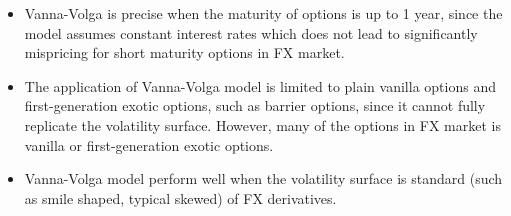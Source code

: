 \begin{itemize}
	\item Vanna-Volga is precise when the maturity of options is up to 1 year, since the model assumes constant interest rates which does not lead to significantly mispricing for short maturity options in FX market.
	\item The application of Vanna-Volga model is limited to plain vanilla options and first-generation exotic options, such as barrier options, since it cannot fully replicate the volatility surface. However, many of the options in FX market is vanilla or first-generation exotic options.
	\item Vanna-Volga model perform well when the volatility surface is standard (such as smile shaped, typical skewed) of FX derivatives.
\end{itemize}


